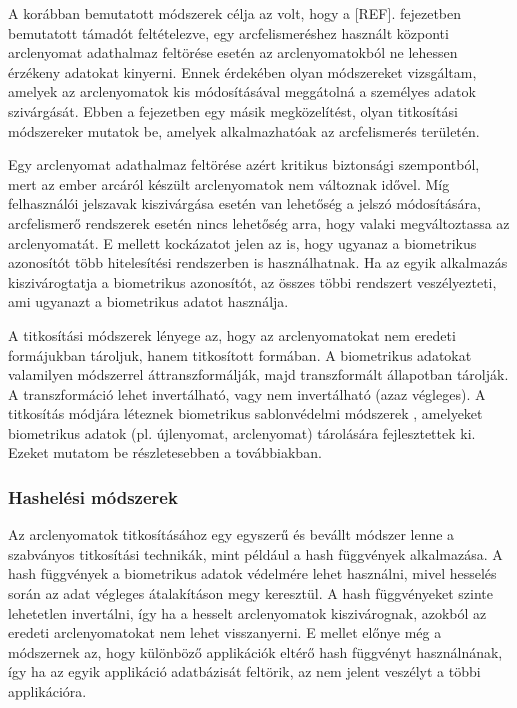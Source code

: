 A korábban bemutatott módszerek célja az volt, hogy a [REF]. fejezetben bemutatott támadót feltételezve, egy arcfelismeréshez használt központi arclenyomat adathalmaz feltörése esetén az arclenyomatokból ne lehessen érzékeny adatokat kinyerni. Ennek érdekében olyan módszereket vizsgáltam, amelyek az arclenyomatok kis módosításával meggátolná a személyes adatok szivárgását. Ebben a fejezetben egy másik megközelítést, olyan titkosítási módszereker mutatok be, amelyek alkalmazhatóak az arcfelismerés területén.

Egy arclenyomat adathalmaz feltörése azért kritikus biztonsági szempontból, mert az ember arcáról készült arclenyomatok nem változnak idővel. Míg felhasználói jelszavak kiszivárgása esetén van lehetőség a jelszó módosítására, arcfelismerő rendszerek esetén nincs lehetőség arra, hogy valaki megváltoztassa az arclenyomatát. E mellett kockázatot jelen az is, hogy ugyanaz a biometrikus azonosítót több hitelesítési rendszerben is használhatnak. Ha az egyik alkalmazás kiszivárogtatja a biometrikus azonosítót, az összes többi rendszert veszélyezteti, ami ugyanazt a biometrikus adatot használja.

A titkosítási módszerek lényege az, hogy az arclenyomatokat nem eredeti formájukban tároljuk, hanem titkosított formában. A biometrikus adatokat valamilyen módszerrel áttranszformálják, majd transzformált állapotban tárolják. A transzformáció lehet invertálható, vagy nem invertálható (azaz végleges). A titkosítás módjára léteznek biometrikus sablonvédelmi módszerek \cite{patel2015cancelable}, amelyeket biometrikus adatok (pl. újlenyomat, arclenyomat) tárolására fejlesztettek ki. Ezeket mutatom be részletesebben a továbbiakban.



\subsubsection{Hashelési módszerek}

Az arclenyomatok titkosításához egy egyszerű és bevállt módszer lenne a szabványos titkosítási technikák, mint például a hash függvények alkalmazása. A hash függvények a biometrikus adatok védelmére lehet használni, mivel hesselés során az adat végleges átalakításon megy keresztül. A hash függvényeket szinte lehetetlen invertálni, így ha a hesselt arclenyomatok kiszivárognak, azokból az eredeti arclenyomatokat nem lehet visszanyerni. E mellet előnye még a módszernek az, hogy különböző applikációk eltérő hash függvényt használnának, így ha az egyik applikáció adatbázisát feltörik, az nem jelent veszélyt a többi applikációra.

